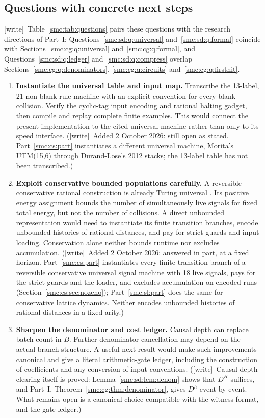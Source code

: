 \documentclass[11pt,letterpaper]{article}
\numberwithin{equation}{section}
\theoremstyle{definition}
\theoremstyle{remark}
\newcommand{\wtag}{\textup{[write]}}
\begin{document}
\subsection{Questions with concrete next steps}\label{smc:sd:sec:questions}
\wtag\ Table~\ref{smc:tab:questions} pairs these questions with the research directions of Part~I: Questions~\ref{smc:sd:q:universal} and~\ref{smc:sd:q:formal} coincide with Sections~\ref{smc:cg:q:universal} and~\ref{smc:cg:q:formal}, and Questions~\ref{smc:sd:q:ledger} and~\ref{smc:sd:q:compress} overlap Sections~\ref{smc:cg:q:denominators}, \ref{smc:cg:q:circuits} and~\ref{smc:cg:q:firsthit}.
\begin{enumerate}
\item\label{smc:sd:q:universal} \textbf{Instantiate the universal table and input map.} Transcribe the 13-label, 21-non-blank-rule machine with an explicit convention for every blank collision. Verify the cyclic-tag input encoding and rational halting gadget, then compile and replay complete finite examples. This would connect the present implementation to the cited universal machine rather than only to its speed interface. (\wtag\ Added 2 October 2026: still open as stated. Part~\ref{smc:cs:part} instantiates a different universal machine, Morita's UTM(15,6) through Durand-Lose's 2012 stacks; the 13-label table has not been transcribed.)
\item\label{smc:sd:q:conservative} \textbf{Exploit conservative bounded populations carefully.} A reversible conservative rational construction is already Turing universal \cite{DL06}. Its positive energy assignment bounds the number of simultaneously live signals for fixed total energy, but not the number of collisions. A direct unbounded representation would need to instantiate its finite transition branches, encode unbounded histories of rational distances, and pay for strict guards and input loading. Conservation alone neither bounds runtime nor excludes accumulation. (\wtag\ Added 2 October 2026: answered in part, at a fixed horizon. Part~\ref{smc:cs:part} instantiates every finite transition branch of a reversible conservative universal signal machine with 18 live signals, pays for the strict guards and the loader, and excludes accumulation on encoded runs (Section~\ref{smc:cs:sec:nozeno}); Part~\ref{smc:sl:part} does the same for conservative lattice dynamics. Neither encodes unbounded histories of rational distances in a fixed arity.)
\item\label{smc:sd:q:ledger} \textbf{Sharpen the denominator and cost ledger.} Causal depth can replace batch count in $B$. Further denominator cancellation may depend on the actual branch structure. A useful next result would make such improvements canonical and give a literal arithmetic-gate ledger, including the construction of coefficients and any conversion of input conventions. (\wtag\ Causal-depth clearing itself is proved: Lemma~\ref{smc:sd:lem:denom} shows that $D^H$ suffices, and Part~I, Theorem~\ref{smc:cg:thm:denominator}, gives $D^h$ event by event. What remains open is a canonical choice compatible with the witness format, and the gate ledger.)

\end{enumerate}
\end{document}
